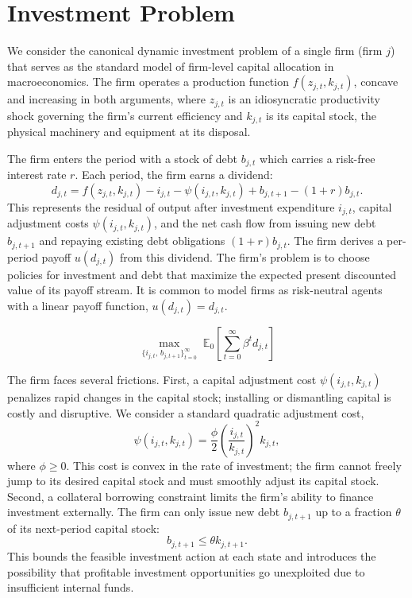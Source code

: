 \section{Investment Problem} \label{sec:investment_problem} \label{sec:investment-problem}

We consider the canonical dynamic investment problem of a single firm (firm $j$) that
serves as the standard model of firm-level capital allocation in macroeconomics.
The firm operates a production function $f(z_{j,t}, k_{j,t})$, concave and increasing
in both arguments, where $z_{j,t}$ is an idiosyncratic productivity shock governing
the firm's current efficiency and $k_{j,t}$ is its capital stock, the physical
machinery and equipment at its disposal.

The firm enters the period with a stock of debt $b_{j,t}$ which carries a risk-free
interest rate $r$. Each period, the firm earns a dividend:
\begin{equation}
    d_{j,t} = f(z_{j,t}, k_{j,t}) - i_{j,t} - \psi(i_{j,t}, k_{j,t})
    + b_{j,t+1} - (1+r)b_{j,t}.
\end{equation}
This represents the residual of output after investment expenditure $i_{j,t}$,
capital adjustment costs $\psi(i_{j,t}, k_{j,t})$, and the net cash flow from
issuing new debt $b_{j,t+1}$ and repaying existing debt obligations $(1+r)b_{j,t}$.
The firm derives a per-period payoff $u(d_{j,t})$ from this dividend. The firm's
problem is to choose policies for investment and debt that maximize the expected
present discounted value of its payoff stream. It is common to model firms as
risk-neutral agents with a linear payoff function, $u(d_{j,t}) = d_{j,t}$.

\begin{equation}
    \max_{\{i_{j,t},\, b_{j,t+1}\}_{t=0}^{\infty}} \;
    \mathbb{E}_0 \left[ \sum_{t=0}^{\infty}
    \beta^{t} d_{j,t} \right]
\end{equation}

The firm faces several frictions. First, a capital adjustment cost
$\psi(i_{j,t}, k_{j,t})$ penalizes rapid changes in the capital stock;
installing or dismantling capital is costly and disruptive. We consider a
standard quadratic adjustment cost,
\begin{equation}
    \psi(i_{j,t}, k_{j,t}) =
    \frac{\phi}{2} \left(\frac{i_{j,t}}{k_{j,t}}\right)^2 k_{j,t},
\end{equation}
where $\phi \geq 0$. This cost is convex in the rate of investment; the firm
cannot freely jump to its desired capital stock and must smoothly adjust its
capital stock. Second, a collateral borrowing constraint limits the firm's
ability to finance investment externally. The firm can only issue new debt
$b_{j,t+1}$ up to a fraction $\theta$ of its next-period capital stock:
\begin{equation}
    b_{j,t+1} \leq \theta k_{j,t+1}.
\end{equation}
This bounds the feasible investment action at each state and introduces the
possibility that profitable investment opportunities go unexploited due to
insufficient internal funds.

